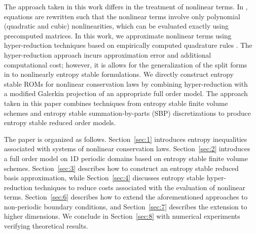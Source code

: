 \documentclass[preprint,10pt]{elsarticle}
\theoremstyle{definition}
\theoremstyle{lemma}
\theoremstyle{theorem}
\theoremstyle{assumption}
\begin{document}
The approach taken in this work differs in the treatment of nonlinear terms.  In \cite{maboudi2018conservative}, equations are rewritten such that the nonlinear terms involve only polynomial (quadratic and cubic) nonlinearities, which can be evaluated exactly using precomputed matrices.  In this work, we approximate nonlinear terms using hyper-reduction techniques based on empirically computed quadrature rules \cite{an2008optimizing, hernandez2017dimensional}.  The hyper-reduction approach incurs approximation error and additional computational cost; however, it is allows for the generalization of the split forms in \cite{maboudi2018conservative} to nonlinearly entropy stable formulations.  We directly construct entropy stable ROMs for nonlinear conservation laws by combining hyper-reduction with a modified Galerkin projection of an appropriate full order model.  The approach taken in this paper combines techniques from entropy stable finite volume schemes \cite{tadmor1987numerical, tadmor2003entropy} and entropy stable summation-by-parts (SBP) discretizations \cite{fisher2013high, carpenter2014entropy, chen2017entropy, crean2018entropy, chan2017discretely, chan2019skew} to produce entropy stable reduced order models.  

The paper is organized as follows.  Section~\ref{sec:1} introduces entropy inequalities associated with systems of nonlinear conservation laws.  Section~\ref{sec:2} introduces a full order model on 1D periodic domains based on entropy stable finite volume schemes.  Section~\ref{sec:3} describes how to construct an entropy stable reduced basis approximation, while Section~\ref{sec:4} discusses entropy stable hyper-reduction techniques to reduce costs associated with the evaluation of nonlinear terms.  Section~\ref{sec:6} describes how to extend the aforementioned approaches to non-periodic boundary conditions, and Section~\ref{sec:7} describes the extension to higher dimensions.  We conclude in Section~\ref{sec:8} with numerical experiments verifying theoretical results.
\end{document}
